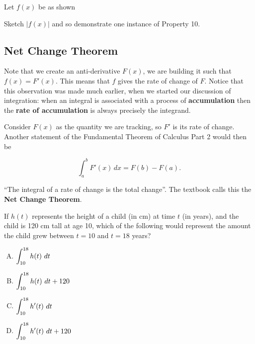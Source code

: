 \newpage
\begin{problem}Let $f(x)$ be as shown


Sketch $|f(x)|$ and so demonstrate one instance of Property 10.

\end{problem}


\newpage

\subsection*{Net Change Theorem}{}

Note that we create an anti-derivative $F(x)$, we are building it such
that $f(x)=F'(x)$. This means that $f$ gives the rate of change of
$F$.  Notice that this observation was made much earlier, when we
started our discussion of integration: when an integral is associated
with a process of {\bf accumulation} then the {\bf rate of accumulation} is
always precisely the integrand.  

\newpage

Consider $F(x)$ as the quantity we are tracking, so $F'$ is its rate
of change.  Another statement of the Fundamental Theorem of Calculus
Part 2 would then be

\begin{boxnote} \label{thm:netchange}
\[ \int_a^bF'(x)\,dx=F(b)-F(a).
\]
\end{boxnote}

``The integral of a rate of change is the
total change''.  The textbook calls this the {\bf Net Change Theorem}. 
\bigskip

\newpage
\begin{problem}
  If $h(t)$ represents the height of a child (in cm) at time $t$ (in
  years), and the child is 120 cm tall at age 10, which of the
  following would represent the amount the child grew between $t=10$
  and $t=18$ years?
\begin{enumerate}[A.]
\item $\displaystyle \int_{10}^{18} h(t)~dt$ \\[2ex]
\item $\displaystyle \int_{10}^{18} h(t)~dt + 120$ \\[2ex]
\item $\displaystyle \int_{10}^{18} h'(t)~dt$ \\[2ex]
\item $\displaystyle \int_{10}^{18} h'(t)~dt + 120$
\end{enumerate}

\end{problem}


